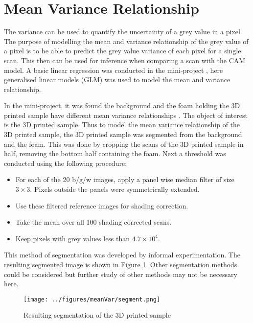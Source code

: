 \documentclass[a4paper]{proc}
\begin{document}
\section{Mean Variance Relationship}
The variance can be used to quantify the uncertainty of a grey value in a pixel. The purpose of modelling the mean and variance relationship of the grey value of a pixel is to be able to predict the grey value variance of each pixel for a single scan. This then can be used for inference when comparing a scan with the CAM model. A basic linear regression was conducted in the mini-project \cite{ip2016inside}, here generalised linear models (GLM) \cite{nelder1972generalized} \cite{mccullagh1984generalized} was used to model the mean and variance relationship.

In the mini-project, it was found the background and the foam holding the 3D printed sample have different mean variance relationships \cite{ip2016inside}. The object of interest is the 3D printed sample. Thus to model the mean variance relationship of the 3D printed sample, the 3D printed sample was segmented from the background and the foam. This was done by cropping the scans of the 3D printed sample in half, removing the bottom half containing the foam. Next a threshold was conducted using the following procedure: 
\begin{itemize}
	\item For each of the 20 b/g/w images, apply a panel wise median filter of size $3\times3$. Pixels outside the panels were symmetrically extended.
	\item Use these filtered reference images for shading correction.
	\item Take the mean over all 100 shading corrected scans.
	\item Keep pixels with grey values less than $4.7\times 10^4$.
\end{itemize}
This method of segmentation was developed by informal experimentation. The resulting segmented image is shown in Figure \ref{fig:segment}. Other segmentation methods could be considered but further study of other methods may not be necessary here.

\begin{figure}
	\centering
	\centerline{
	\texttt{[image: ../figures/meanVar/segment.png]}
	}
	\caption{Resulting segmentation of the 3D printed sample}
	\label{fig:segment}
\end{figure}
\end{document}
